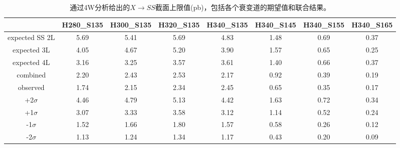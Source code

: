 \begin{table}
\scriptsize
  \centering
  \begin{tabular}{c|c|c|c|c|c|c|c}
  \hline
                &H280\_S135     &H300\_S135     &H320\_S135     &H340\_S135     &H340\_S145     &H340\_S155     &H340\_S165\\
\hline
expected SS 2L  &5.69   &5.41   &5.69   &4.83   &1.48   &0.69   &0.37   \\
\hline
expected 3L     &4.05   &4.67   &5.20   &3.90   &1.57   &0.65   &0.25   \\
\hline
expected 4L     &3.16   &3.25   &3.57   &3.61   &1.40   &0.66   &0.37   \\
\hline
combined        &2.20   &2.43   &2.53   &2.17   &0.92   &0.39   &0.19   \\
\hline
observed        &1.74   &2.15   &2.34   &2.45   &0.65   &0.35   &0.17   \\
\hline
+2$\sigma$     &4.46    &4.79   &5.13   &4.42   &1.63   &0.72   &0.34   \\
\hline
+1$\sigma$     &3.07    &3.33   &3.58   &3.12   &1.14   &0.52   &0.24   \\
\hline
-1$\sigma$     &1.52    &1.66   &1.80   &1.57   &0.58   &0.26   &0.12   \\
\hline
-2$\sigma$     &1.13    &1.24   &1.34   &1.17   &0.43   &0.20   &0.09   \\
\hline
  \end{tabular}
 \caption{通过4W分析给出的$X\rightarrow SS$截面上限值(pb)，包括各个衰变道的期望值和联合结果。}
  \label{tab:limit-comb-SS}
\end{table}


